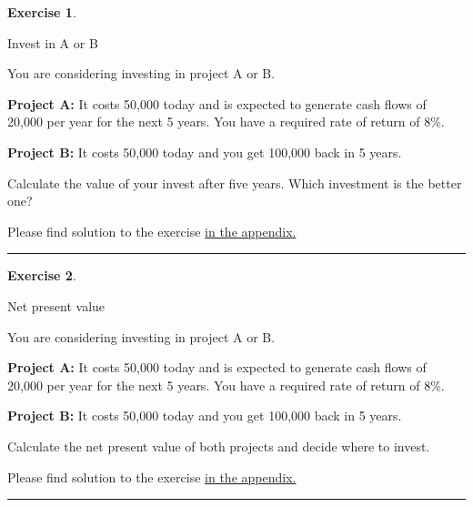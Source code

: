 \documentclass[
  12pt,
  oneside]{book}
\theoremstyle{definition}
\theoremstyle{definition}
\theoremstyle{definition}
\newtheorem{exercise}{Exercise}[chapter]
\theoremstyle{definition}
\theoremstyle{remark}
\begin{document}
\begin{exercise}
\protect\hypertarget{exr:invaorb}{}\label{exr:invaorb}

Invest in A or B

You are considering investing in project A or B.

\textbf{Project A:} It costs 50,000 today and is expected to generate cash flows of 20,000 per year for the next 5 years. You have a required rate of return of 8\%.

\textbf{Project B:} It costs 50,000 today and you get 100,000 back in 5 years.

Calculate the value of your invest after five years. Which investment is the better one?

Please find solution to the exercise \protect\hyperlink{sol:invaorb}{in the appendix.}

\begin{center}\rule{0.5\linewidth}{0.5pt}\end{center}

\end{exercise}

\begin{exercise}
\protect\hypertarget{exr:netpresentvalue}{}\label{exr:netpresentvalue}

Net present value

You are considering investing in project A or B.

\textbf{Project A:} It costs 50,000 today and is expected to generate cash flows of 20,000 per year for the next 5 years. You have a required rate of return of 8\%.

\textbf{Project B:} It costs 50,000 today and you get 100,000 back in 5 years.

Calculate the net present value of both projects and decide where to invest.

Please find solution to the exercise \protect\hyperlink{sol:netpresentvalue}{in the appendix.}

\begin{center}\rule{0.5\linewidth}{0.5pt}\end{center}

\end{exercise}
\end{document}
